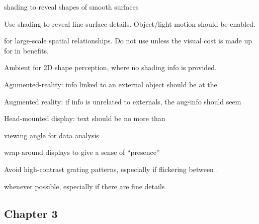\begin{compactenum}

    \item {} shading to reveal shapes of smooth surfaces

    \item Use  shading to reveal fine surface details. Object/light
        motion should be enabled.

    \item {} for large-scale spatial relationships. Do not use
        unless the visual cost is made up for in benefits.

    \item Ambient  for 2D shape perception, where no shading info
        is provided.

    \item Agumented-reality: info linked to an external object should be at the

    \item Augmented reality: if info is unrelated to externals, the aug-info
        should seem 

    \item Head-mounted display: text should be no more than 

    \item {} viewing angle for data analysis

    \item wrap-around displays to give a sense of ``presence''

    \item Avoid high-contrast grating patterns, especially if flickering
        between .

    \item {} whenever possible, especially if there are fine details

\end{compactenum}

\subsection{Chapter 3}


